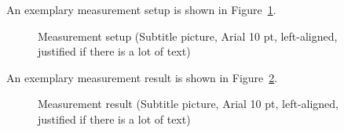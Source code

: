 \documentclass{article}
\begin{document}
An exemplary measurement setup is shown in Figure~\ref{fig:setup}.

\begin{figure}
	\centering
	\caption{Measurement setup (Subtitle picture, Arial 10 pt, left-aligned, justified if there is a lot of text)}
	\label{fig:setup}
\end{figure}

An exemplary measurement result is shown in Figure~\ref{fig:result}.

\begin{figure}
	\centering
	\caption{Measurement result (Subtitle picture, Arial 10 pt, left-aligned, justified if there is a lot of text)}
	\label{fig:result}
\end{figure}

%
\end{document}
